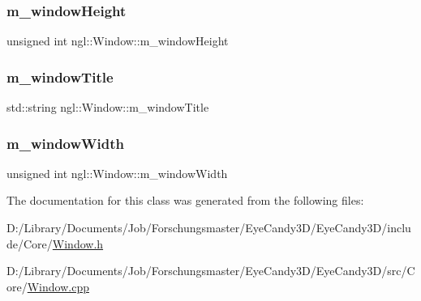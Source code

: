 \mbox{\label{classngl_1_1_window_ac364c4ea0f23674b12cd336b24538cf2}} 
\subsubsection{\texorpdfstring{m\+\_\+window\+Height}{m\_windowHeight}}
{\footnotesize\ttfamily unsigned int ngl\+::\+Window\+::m\+\_\+window\+Height\hspace{0.3cm}{\ttfamily [protected]}}

\mbox{\label{classngl_1_1_window_a2336390ab4b8659c327e95c667604511}} 
\subsubsection{\texorpdfstring{m\+\_\+window\+Title}{m\_windowTitle}}
{\footnotesize\ttfamily std\+::string ngl\+::\+Window\+::m\+\_\+window\+Title\hspace{0.3cm}{\ttfamily [protected]}}

\mbox{\label{classngl_1_1_window_a04f530842b0b3509be8337c06dad806d}} 
\subsubsection{\texorpdfstring{m\+\_\+window\+Width}{m\_windowWidth}}
{\footnotesize\ttfamily unsigned int ngl\+::\+Window\+::m\+\_\+window\+Width\hspace{0.3cm}{\ttfamily [protected]}}



The documentation for this class was generated from the following files\+:\begin{DoxyCompactItemize}
\item 
D\+:/\+Library/\+Documents/\+Job/\+Forschungsmaster/\+Eye\+Candy3\+D/\+Eye\+Candy3\+D/include/\+Core/\mbox{\hyperlink{_core_2_window_8h}{Window.\+h}}\item 
D\+:/\+Library/\+Documents/\+Job/\+Forschungsmaster/\+Eye\+Candy3\+D/\+Eye\+Candy3\+D/src/\+Core/\mbox{\hyperlink{_core_2_window_8cpp}{Window.\+cpp}}\end{DoxyCompactItemize}

